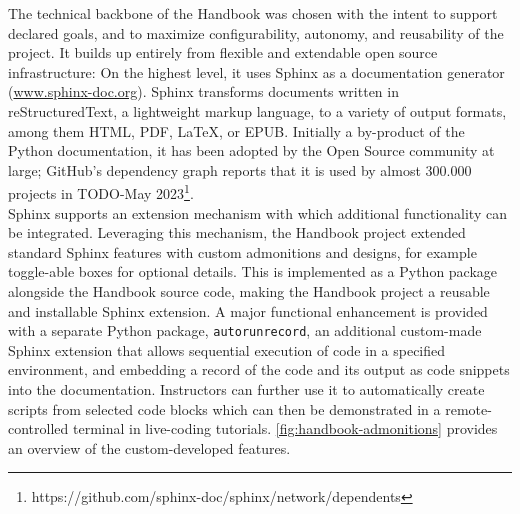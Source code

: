 The technical backbone of the Handbook was chosen with the intent to support declared goals, and to maximize configurability, autonomy, and reusability of the project.
It builds up entirely from flexible and extendable open source infrastructure:
On the highest level, it uses Sphinx as a documentation generator (\href{https://www.sphinx-doc.org/en/master/}{www.sphinx-doc.org}).
Sphinx transforms documents written in reStructuredText, a lightweight markup language, to a variety of output formats, among them HTML, PDF, \LaTeX, or EPUB.
Initially a by-product of the Python documentation, it has been adopted by the Open Source community at large;
GitHub's dependency graph reports that it is used by almost 300.000 projects in TODO-May 2023\footnote{https://github.com/sphinx-doc/sphinx/network/dependents}. \\
Sphinx supports an extension mechanism with which additional functionality can be integrated.
Leveraging this mechanism, the Handbook project extended standard Sphinx features with custom admonitions and designs, for example toggle-able boxes for optional details.
This is implemented as a Python package alongside the Handbook source code, making the Handbook project a reusable and installable Sphinx extension.
A major functional enhancement is provided with a separate Python package, \texttt{autorunrecord}, an additional custom-made Sphinx extension that allows sequential execution of code in a specified environment, and embedding a record of the code and its output as code snippets into the documentation. 
Instructors can further use it to automatically create scripts from selected code blocks which can then be demonstrated in a remote-controlled terminal in live-coding tutorials.
\cref{fig:handbook-admonitions} provides an overview of the custom-developed features. \\


